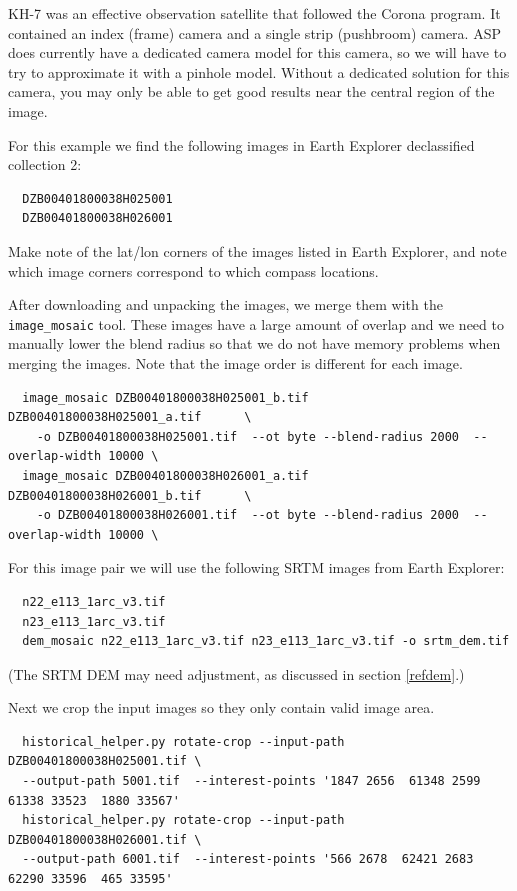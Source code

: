 KH-7 was an effective observation satellite that followed the Corona program.
It contained an index (frame) camera and a single strip (pushbroom) camera.
ASP does currently have a dedicated camera model for this camera, so we will
have to try to approximate it with a pinhole model.  Without a dedicated solution
for this camera, you may only be able to get good results near the central region
of the image.

For this example we find the following images in Earth Explorer declassified collection 2:
\begin{verbatim}
  DZB00401800038H025001
  DZB00401800038H026001
\end{verbatim}

Make note of the lat/lon corners of the images listed in Earth Explorer, and note which
image corners correspond to which compass locations.

After downloading and unpacking the images, we merge them with the \texttt{image\_mosaic} tool.
These images have a large amount of overlap and we need to manually lower the blend radius so
that we do not have memory problems when merging the images.  Note that the image order is 
different for each image.

\begin{verbatim}
  image_mosaic DZB00401800038H025001_b.tif  DZB00401800038H025001_a.tif      \
    -o DZB00401800038H025001.tif  --ot byte --blend-radius 2000  --overlap-width 10000 \
  image_mosaic DZB00401800038H026001_a.tif  DZB00401800038H026001_b.tif      \
    -o DZB00401800038H026001.tif  --ot byte --blend-radius 2000  --overlap-width 10000 \
\end{verbatim}

For this image pair we will use the following SRTM images from Earth Explorer:

\begin{verbatim}
  n22_e113_1arc_v3.tif
  n23_e113_1arc_v3.tif
  dem_mosaic n22_e113_1arc_v3.tif n23_e113_1arc_v3.tif -o srtm_dem.tif
\end{verbatim}

(The SRTM DEM may need adjustment, as discussed in section \ref{refdem}.)

Next we crop the input images so they only contain valid image area.

\begin{verbatim}
  historical_helper.py rotate-crop --input-path DZB00401800038H025001.tif \
  --output-path 5001.tif  --interest-points '1847 2656  61348 2599  61338 33523  1880 33567'
  historical_helper.py rotate-crop --input-path DZB00401800038H026001.tif \
  --output-path 6001.tif  --interest-points '566 2678  62421 2683  62290 33596  465 33595'
\end{verbatim}


